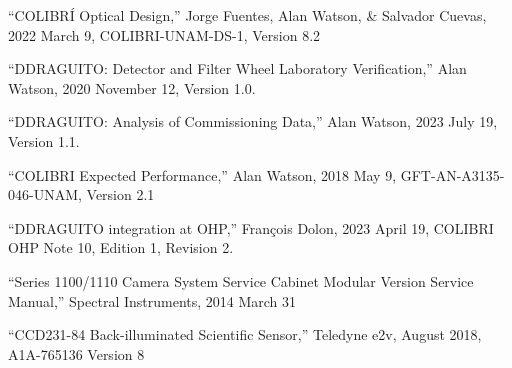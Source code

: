 \clearpage
\begin{thebibliography}{Te2v}

“COLIBRÍ Optical Design,” Jorge Fuentes, Alan Watson, \& Salvador Cuevas, 2022 March 9, COLIBRI-UNAM-DS-1, Version 8.2

“DDRAGUITO: Detector and Filter Wheel Laboratory Verification,” Alan Watson, 2020 November 12, Version 1.0.

“DDRAGUITO: Analysis of Commissioning Data,” Alan Watson, 2023 July 19, Version 1.1.

“COLIBRI Expected Performance,” Alan Watson, 2018 May 9, GFT-AN-A3135-046-UNAM, Version 2.1

“DDRAGUITO integration at OHP,” François Dolon, 2023 April 19, COLIBRI OHP Note 10, Edition 1, Revision 2.

“Series 1100/1110 Camera System Service Cabinet Modular Version Service Manual,” Spectral Instruments, 2014 March 31

“CCD231-84 Back-illuminated Scientific Sensor,” Teledyne e2v, August 2018, A1A-765136 Version 8

\end{thebibliography}
